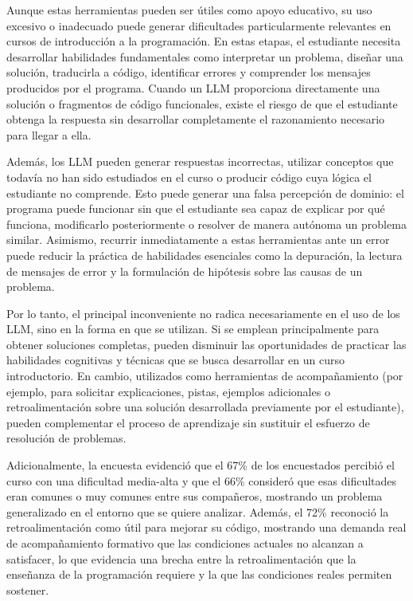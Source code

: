 \documentclass[letterpaper, 10 pt, conference]{ieeeconf}
\begin{document}
Aunque estas herramientas pueden ser útiles como apoyo educativo, su uso excesivo o inadecuado puede generar dificultades particularmente relevantes en cursos de introducción a la programación. En estas etapas, el estudiante necesita desarrollar habilidades fundamentales como interpretar un problema, diseñar una solución, traducirla a código, identificar errores y comprender los mensajes producidos por el programa. Cuando un LLM proporciona directamente una solución o fragmentos de código funcionales, existe el riesgo de que el estudiante obtenga la respuesta sin desarrollar completamente el razonamiento necesario para llegar a ella.

Además, los LLM pueden generar respuestas incorrectas, utilizar conceptos que todavía no han sido estudiados en el curso o producir código cuya lógica el estudiante no comprende. Esto puede generar una falsa percepción de dominio: el programa puede funcionar sin que el estudiante sea capaz de explicar por qué funciona, modificarlo posteriormente o resolver de manera autónoma un problema similar. Asimismo, recurrir inmediatamente a estas herramientas ante un error puede reducir la práctica de habilidades esenciales como la depuración, la lectura de mensajes de error y la formulación de hipótesis sobre las causas de un problema.

Por lo tanto, el principal inconveniente no radica necesariamente en el uso de los LLM, sino en la forma en que se utilizan. Si se emplean principalmente para obtener soluciones completas, pueden disminuir las oportunidades de practicar las habilidades cognitivas y técnicas que se busca desarrollar en un curso introductorio. En cambio, utilizados como herramientas de acompañamiento (por ejemplo, para solicitar explicaciones, pistas, ejemplos adicionales o retroalimentación sobre una solución desarrollada previamente por el estudiante), pueden complementar el proceso de aprendizaje sin sustituir el esfuerzo de resolución de problemas.

Adicionalmente, la encuesta evidenció que el 67\% de los encuestados percibió el curso con una dificultad media-alta y que el 66\% consideró que esas dificultades eran comunes o muy comunes entre sus compañeros, mostrando un problema generalizado en el entorno que se quiere analizar. Además, el 72\% reconoció la retroalimentación como útil para mejorar su código, mostrando una demanda real de acompañamiento formativo que las condiciones actuales no alcanzan a satisfacer, lo que evidencia una brecha entre la retroalimentación que la enseñanza de la programación requiere y la que las condiciones reales permiten sostener.
\end{document}

